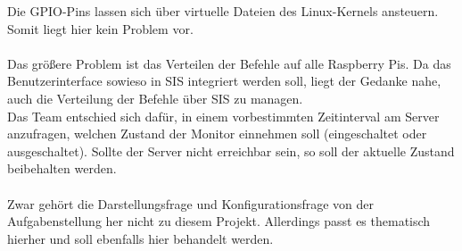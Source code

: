 Die GPIO-Pins lassen sich über virtuelle Dateien des Linux-Kernels ansteuern. Somit liegt hier kein Problem vor.\\
\\
Das größere Problem ist das Verteilen der Befehle auf alle Raspberry Pis. Da das Benutzerinterface sowieso in SIS integriert werden soll, liegt der Gedanke nahe, auch die Verteilung der Befehle über SIS zu managen.\\
Das Team entschied sich dafür, in einem vorbestimmten Zeitinterval am Server anzufragen, welchen Zustand der Monitor einnehmen soll (eingeschaltet oder ausgeschaltet). Sollte der Server nicht erreichbar sein, so soll der aktuelle Zustand beibehalten werden.\\
\\
Zwar gehört die Darstellungsfrage und Konfigurationsfrage von der Aufgabenstellung her nicht zu diesem Projekt. Allerdings passt es thematisch hierher und soll ebenfalls hier behandelt werden.\\